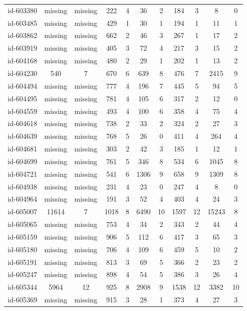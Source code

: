 \begin{tabular}{ccccccccccc}
id-603380 & missing & missing & 222 & 4 & 36 & 2 & 184 & 3 & 8 & 0\\
id-603485 & missing & missing & 429 & 1 & 30 & 1 & 194 & 1 & 11 & 1\\
id-603862 & missing & missing & 662 & 2 & 46 & 3 & 267 & 1 & 17 & 2\\
id-603919 & missing & missing & 405 & 3 & 72 & 4 & 217 & 3 & 15 & 2\\
id-604168 & missing & missing & 480 & 2 & 29 & 1 & 202 & 1 & 13 & 2\\
id-604230 & 540 & 7 & 670 & 6 & 639 & 8 & 476 & 7 & 2415 & 9\\
id-604494 & missing & missing & 777 & 4 & 196 & 7 & 445 & 5 & 94 & 5\\
id-604495 & missing & missing & 781 & 4 & 105 & 6 & 317 & 2 & 12 & 0\\
id-604559 & missing & missing & 493 & 4 & 100 & 6 & 358 & 4 & 75 & 4\\
id-604618 & missing & missing & 738 & 2 & 33 & 2 & 324 & 2 & 27 & 3\\
id-604639 & missing & missing & 768 & 5 & 26 & 0 & 411 & 4 & 264 & 4\\
id-604681 & missing & missing & 303 & 2 & 42 & 3 & 185 & 1 & 12 & 1\\
id-604699 & missing & missing & 761 & 5 & 346 & 8 & 534 & 6 & 1045 & 8\\
id-604721 & missing & missing & 541 & 6 & 1306 & 9 & 658 & 9 & 1309 & 8\\
id-604938 & missing & missing & 231 & 4 & 23 & 0 & 247 & 4 & 8 & 0\\
id-604964 & missing & missing & 191 & 3 & 52 & 4 & 403 & 4 & 24 & 3\\
id-605007 & 11614 & 7 & 1018 & 8 & 6490 & 10 & 1597 & 12 & 15243 & 8\\
id-605065 & missing & missing & 753 & 4 & 34 & 2 & 343 & 2 & 44 & 4\\
id-605159 & missing & missing & 906 & 5 & 112 & 6 & 417 & 3 & 65 & 3\\
id-605180 & missing & missing & 706 & 4 & 109 & 6 & 459 & 5 & 10 & 2\\
id-605191 & missing & missing & 813 & 3 & 69 & 5 & 366 & 2 & 23 & 2\\
id-605247 & missing & missing & 898 & 4 & 54 & 5 & 386 & 3 & 26 & 4\\
id-605344 & 5964 & 12 & 925 & 8 & 2908 & 9 & 1538 & 12 & 3382 & 10\\
id-605369 & missing & missing & 915 & 3 & 28 & 1 & 373 & 4 & 27 & 3\\

\end{tabular}
